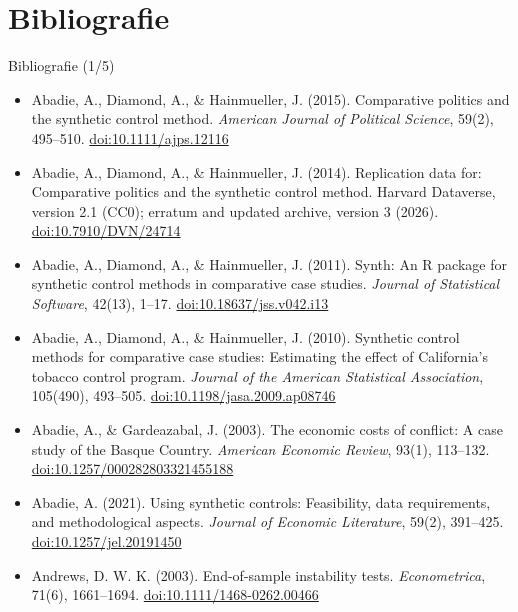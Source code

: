 \section{Bibliografie}

\begin{frame}{Bibliografie (1/5)}
\itemsize{\tiny}
\begin{itemize}
    \item Abadie, A., Diamond, A., \& Hainmueller, J. (2015). Comparative politics and the synthetic control method. \textit{American Journal of Political Science}, 59(2), 495--510. \href{https://doi.org/10.1111/ajps.12116}{doi:10.1111/ajps.12116}
    \item Abadie, A., Diamond, A., \& Hainmueller, J. (2014). Replication data for: Comparative politics and the synthetic control method. Harvard Dataverse, version 2.1 (CC0); erratum and updated archive, version 3 (2026). \href{https://doi.org/10.7910/DVN/24714}{doi:10.7910/DVN/24714}
    \item Abadie, A., Diamond, A., \& Hainmueller, J. (2011). Synth: An R package for synthetic control methods in comparative case studies. \textit{Journal of Statistical Software}, 42(13), 1--17. \href{https://doi.org/10.18637/jss.v042.i13}{doi:10.18637/jss.v042.i13}
    \item Abadie, A., Diamond, A., \& Hainmueller, J. (2010). Synthetic control methods for comparative case studies: Estimating the effect of California’s tobacco control program. \textit{Journal of the American Statistical Association}, 105(490), 493--505. \href{https://doi.org/10.1198/jasa.2009.ap08746}{doi:10.1198/jasa.2009.ap08746}
    \item Abadie, A., \& Gardeazabal, J. (2003). The economic costs of conflict: A case study of the Basque Country. \textit{American Economic Review}, 93(1), 113--132. \href{https://doi.org/10.1257/000282803321455188}{doi:10.1257/000282803321455188}
    \item Abadie, A. (2021). Using synthetic controls: Feasibility, data requirements, and methodological aspects. \textit{Journal of Economic Literature}, 59(2), 391--425. \href{https://doi.org/10.1257/jel.20191450}{doi:10.1257/jel.20191450}
    \item Andrews, D. W. K. (2003). End-of-sample instability tests. \textit{Econometrica}, 71(6), 1661--1694. \href{https://doi.org/10.1111/1468-0262.00466}{doi:10.1111/1468-0262.00466}

\end{itemize}
\end{frame}
